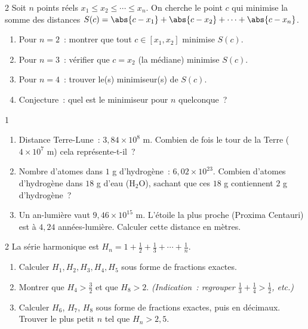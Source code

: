 \begin{probleme}{2}
Soit $n$ points r\'eels $x_1 \leq x_2 \leq \cdots \leq x_n$.
On cherche le point $c$ qui minimise la somme des distances
$S(c) = \abs{c-x_1} + \abs{c-x_2} + \cdots + \abs{c-x_n}$.
\begin{enumerate}
  \item Pour $n=2$~: montrer que tout $c \in [x_1, x_2]$ minimise $S(c)$.
  \item Pour $n=3$~: v\'erifier que $c = x_2$ (la m\'ediane) minimise $S(c)$.
  \item Pour $n=4$~: trouver le(s) minimiseur(s) de $S(c)$.
  \item Conjecture~: quel est le minimiseur pour $n$ quelconque~?
\end{enumerate}
\end{probleme}

\begin{probleme}{1}
\begin{enumerate}
  \item Distance Terre-Lune~: $3{,}84\times10^8$ m.
        Combien de fois le tour de la Terre ($4\times10^7$ m) cela repr\'esente-t-il~?
  \item Nombre d'atomes dans $1$ g d'hydrog\`ene~: $6{,}02\times10^{23}$.
        Combien d'atomes d'hydrog\`ene dans $18$ g d'eau ($\text{H}_2\text{O}$), sachant
        que ces $18$ g contiennent $2$ g d'hydrog\`ene~?
  \item Un an-lumi\`ere vaut $9{,}46\times10^{15}$ m.
        L'\'etoile la plus proche (Proxima Centauri) est \`a $4{,}24$
        ann\'ees-lumi\`ere. Calculer cette distance en m\`etres.
\end{enumerate}
\end{probleme}

\begin{probleme}{2}
La s\'erie harmonique est $H_n = 1 + \frac{1}{2} + \frac{1}{3} + \cdots + \frac{1}{n}$.
\begin{enumerate}
  \item Calculer $H_1, H_2, H_3, H_4, H_5$ sous forme de fractions exactes.
  \item Montrer que $H_4 > \frac{3}{2}$ et que $H_8 > 2$.
        \emph{(Indication~: regrouper $\frac{1}{3}+\frac{1}{4} > \frac{1}{2}$, etc.)}
  \item Calculer $H_6$, $H_7$, $H_8$ sous forme de fractions exactes,
        puis en d\'ecimaux.
        Trouver le plus petit $n$ tel que $H_n > 2{,}5$.
\end{enumerate}
\end{probleme}


